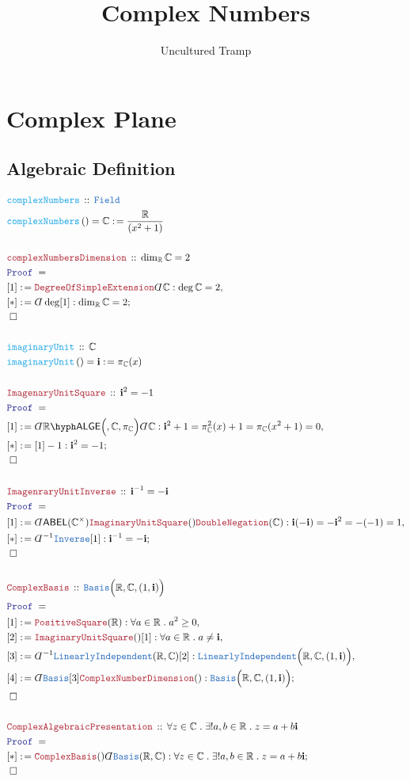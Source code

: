 \documentclass[12pt]{scrartcl}
\author{Uncultured Tramp}
\title{Complex Numbers}
\newcommand{\TYPE}[1]{\textcolor{NavyBlue}{\mathtt{#1}}}
\newcommand{\FUNC}[1]{\textcolor{Cerulean}{\mathtt{#1}}}
\newcommand{\LOGIC}[1]{\textcolor{Blue}{\mathtt{#1}}}
\newcommand{\THM}[1]{\textcolor{Maroon}{\mathtt{#1}}}
\renewcommand{\.}{\; . \;}
\newcommand{\de}{: \kern 0.1pc =}
\newcommand{\Act}[1]{\left( #1 \right)}
\newcommand{\Theorem}[2]{& \THM{#1} \, :: \, #2 \\ & \Proof = \\ }
\newcommand{\DeclareFunc}[2]{& \FUNC{#1} \, :: \, #2 \\}
\newcommand{\DefineNamedFunc}[4]{&  \FUNC{#1}\Act{#2} = #3 \de #4 \\}
\newcommand{\Page}[1]{ \begin{align*} #1 \end{align*}   }
\newcommand{ \bd }{ \ByDef }
\newcommand{\Reals}{\mathbb{R} }
\newcommand{\Complex}{\mathbb{C}}
\renewcommand{\i}{\mathbf{i}}
\newcommand{\Say}[3]{& #1 \de #2 : #3, \\}
\newcommand{\Conclude}[3]{& #1 \de #2 : #3; \\}
\newcommand{\QED}{\; \square}
\newcommand{\EndProof}{& \QED \\}
\newcommand{\ByDef}{\rotatebox[origin=c]{-180}{$D$}}%
\newcommand{\Proof}{\LOGIC{Proof} \; }
\newcommand{\ABEL}{\mathsf{ABEL}}
\newcommand{\LI}{\TYPE{LinearlyIndependent}}
\newcommand{\LALGE}[1]{#1\hyph\mathsf{ALGE}}
\newcommand{\Field}{\TYPE{Field}}
\begin{document}
\maketitle
\newpage
\tableofcontents
\newpage
\section{Complex Plane}
\subsection{Algebraic Definition}
\Page{
	\DeclareFunc{complexNumbers}{\Field}
	\DefineNamedFunc{complexNumbers}{}{\Complex}{\frac{\Reals}{(x^2 + 1)}}
	\\
	\Theorem{complexNumbersDimension}{\dim_\Reals \Complex = 2}
	\Say{[1]}{\THM{DegreeOfSimpleExtension}\bd \Complex}{\deg \Complex = 2}
	\Conclude{[*]}{\bd \deg [1]}{\dim_{\Reals} \Complex = 2}
	\EndProof
	\\
	\DeclareFunc{imaginaryUnit}{\Complex}
	\DefineNamedFunc{imaginaryUnit}{}{\i}{\pi_{\Complex}(x)}
	\\
	\Theorem{ImagenaryUnitSquare}{\i^2 = -1}
	\Say{[1]}{ \bd \LALGE{\Reals}\Big(  ,\Complex, \pi_\Complex \Big) \bd \Complex}{ \i^2 + 1 = \pi^2_\Complex(x) + 1 = \pi_\Complex(x^2 + 1) = 0 }
	\Conclude{[*]}{[1] -1}{\i^2 = - 1}
	\EndProof
	\\
	\Theorem{ImagenraryUnitInverse}{\i^{-1} = -\i}
	\Say{[1]}{\bd \ABEL(\Complex^\times) \THM{ImaginaryUnitSquare}()\THM{DoubleNegation}(\Complex)}{\i (-\i) = - \i^2 = -(-1) = 1}
	\Conclude{[*]}{\bd^{-1} \TYPE{Inverse}[1]}{\i^{-1} = -\i}
	\EndProof
	\\
	\Theorem{ComplexBasis}{\TYPE{Basis}\Big(\Reals,\Complex, (1,\i)\Big)}
	\Say{[1]}{\THM{PositiveSquare}(\Reals)}{\forall a \in \Reals \. a^2 \ge 0}
	\Say{[2]}{\THM{ImaginaryUnitSquare}()[1]}{\forall a \in \Reals \. a \neq \i}
	\Say{[3]}{\bd^{-1} \LI(\Reals,\Complex)[2]}{\LI\Big(\Reals,\Complex, (1,\i) \Big) }
	\Conclude{[4]}{\bd \TYPE{Basis} [3] \THM{ComplexNumberDimension}()}{\TYPE{Basis}\Big(\Reals,\Complex, (1,\i)\Big)}
	\EndProof
	\\
	\Theorem{ComplexAlgebraicPresentation}{\forall z \in \Complex \. \exists! a,b \in \Reals \. z = a + b\i}
	\Conclude{[*]}{\THM{ComplexBasis}()\bd \TYPE{Basis}(\Reals,\Complex)}{\forall z \in \Complex \. \exists! a,b \in \Reals \. z = a + b\i}
	\EndProof
}
\end{document}
